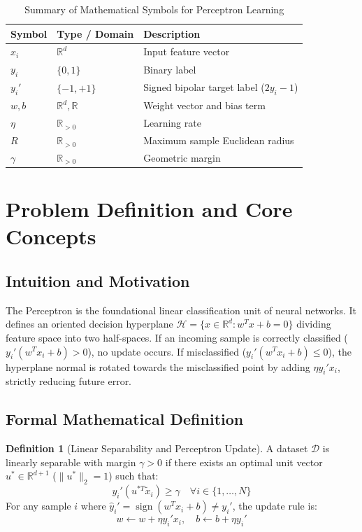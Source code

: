 \documentclass[11pt,a4paper]{article}
\theoremstyle{definition}
\newtheorem{definition}{Definition}[section]
\begin{document}
\begin{table}[h]
\centering
\caption{Summary of Mathematical Symbols for Perceptron Learning}
\begin{tabular}{lll}
\toprule
\textbf{Symbol} & \textbf{Type / Domain} & \textbf{Description} \\
\midrule
$x_i$ & $\mathbb{R}^d$ & Input feature vector \\
$y_i$ & $\{0, 1\}$ & Binary label \\
$y_i'$ & $\{-1, +1\}$ & Signed bipolar target label ($2y_i - 1$) \\
$w, b$ & $\mathbb{R}^d, \mathbb{R}$ & Weight vector and bias term \\
$\eta$ & $\mathbb{R}_{> 0}$ & Learning rate \\
$R$ & $\mathbb{R}_{> 0}$ & Maximum sample Euclidean radius \\
$\gamma$ & $\mathbb{R}_{> 0}$ & Geometric margin \\
\bottomrule
\end{tabular}
\end{table}

\section{Problem Definition and Core Concepts}

\subsection{Intuition and Motivation}
The Perceptron is the foundational linear classification unit of neural networks. It defines an oriented decision hyperplane $\mathcal{H} = \{x \in \mathbb{R}^d : w^T x + b = 0\}$ dividing feature space into two half-spaces. If an incoming sample is correctly classified ($y_i'(w^T x_i + b) > 0$), no update occurs. If misclassified ($y_i'(w^T x_i + b) \le 0$), the hyperplane normal is rotated towards the misclassified point by adding $\eta y_i' x_i$, strictly reducing future error.

\subsection{Formal Mathematical Definition}
\begin{definition}[Linear Separability and Perceptron Update]
A dataset $\mathcal{D}$ is linearly separable with margin $\gamma > 0$ if there exists an optimal unit vector $u^* \in \mathbb{R}^{d+1}$ ($\|u^*\|_2 = 1$) such that:
\begin{equation}
y_i' (u^{*T} \tilde{x}_i) \ge \gamma \quad \forall i \in \{1, \dots, N\}
\end{equation}
For any sample $i$ where $\hat{y}_i' = \operatorname{sign}(w^T x_i + b) \ne y_i'$, the update rule is:
\begin{equation}
w \gets w + \eta y_i' x_i, \quad b \gets b + \eta y_i' \label{eq:perceptron_update}
\end{equation}
\end{definition}
\end{document}
